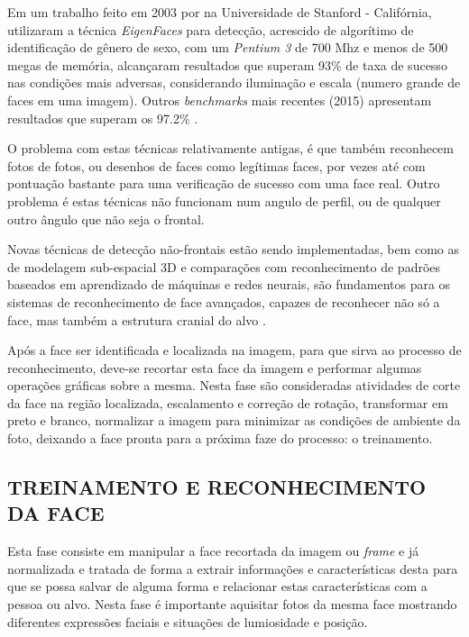 Em um trabalho feito em 2003 por \cite{final_project_stanford} na Universidade de Stanford - Califórnia, utilizaram a técnica \textit{EigenFaces} para detecção, acrescido de algorítimo de identificação de gênero de sexo, com um \textit{Pentium 3} de 700 Mhz e menos de 500 megas de memória, alcançaram resultados que superam 93\% de taxa de sucesso nas condições mais adversas, considerando iluminação e escala (numero grande de faces em uma imagem). Outros \textit{benchmarks} mais recentes (2015) apresentam resultados que superam os 97.2\% \cite{stats_hong_kong}.

O problema com estas técnicas relativamente antigas, é que também reconhecem fotos de fotos, ou desenhos de faces como legítimas faces, por vezes até com pontuação bastante para uma verificação de sucesso com uma face real. Outro problema é estas técnicas não funcionam num angulo de perfil, ou de qualquer outro ângulo que não seja o frontal.

Novas técnicas de detecção não-frontais estão sendo implementadas, bem como as de modelagem sub-espacial 3D e comparações com reconhecimento de padrões baseados em aprendizado de máquinas e redes neurais, são fundamentos para os sistemas de reconhecimento de face avançados, capazes de reconhecer não só a face, mas também a estrutura cranial do alvo \cite{3dmodel_fd}. 

Após a face ser identificada e localizada na imagem, para que sirva ao processo de reconhecimento, deve-se recortar esta face da imagem e performar algumas operações gráficas sobre a mesma. Nesta fase são consideradas atividades de corte da face na região localizada, escalamento e correção de rotação, transformar em preto e branco, normalizar a imagem para minimizar as condições de ambiente da foto, deixando a face pronta para a próxima faze do processo: o treinamento.


\subsection{TREINAMENTO E RECONHECIMENTO DA FACE} \label{subsec:treinrecface}

Esta fase consiste em manipular a face recortada da imagem ou \textit{frame} e já normalizada e tratada de forma a extrair informações e características desta para que se possa salvar de alguma forma e relacionar estas características com a pessoa ou alvo. Nesta fase é importante aquisitar fotos da mesma face mostrando diferentes expressões faciais e situações de lumiosidade e posição.

